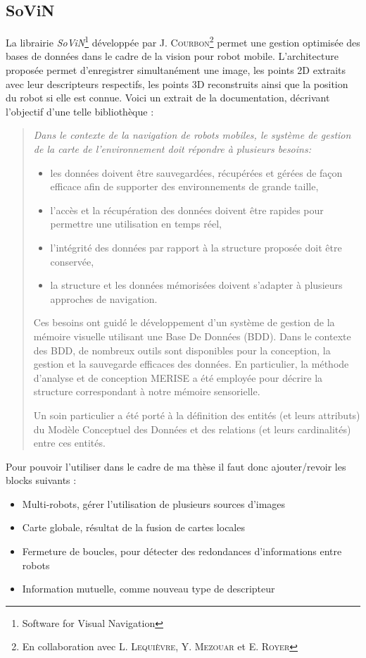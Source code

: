 \subsection{SoViN}
\label{subsub:sovin}

       
La librairie \emph{SoViN}\footnote{Software for Visual Navigation} développée par J. \textsc{Courbon}\footnote{En collaboration avec L. \textsc{Lequièvre}, Y. \textsc{Mezouar} et E. \textsc{Royer}} permet une gestion optimisée des bases de données dans le cadre de la vision pour robot mobile.
L'architecture proposée permet d'enregistrer simultanément une image, les points 2D extraits avec leur descripteurs respectifs, les points 3D reconstruits ainsi que la position du robot si elle est connue. Voici un extrait de la documentation, décrivant l'objectif d'une telle bibliothèque :
\begin{quote}
\it Dans le contexte de la navigation de robots mobiles, le système de gestion de la carte de l'environnement doit répondre à plusieurs besoins:
\begin{itemize}
\item les données doivent être sauvegardées, récupérées et gérées de façon efficace afin de supporter des environnements de grande taille,
\item l'accès et la récupération des données doivent être rapides pour permettre une utilisation en temps réel,
\item l'intégrité des données par rapport à la structure proposée doit être conservée,
\item la structure et les données mémorisées doivent s'adapter à plusieurs approches de navigation.
\end{itemize}

Ces besoins ont guidé le développement d'un système de gestion de la mémoire visuelle utilisant une Base De Données (BDD). Dans le contexte des BDD, de nombreux outils sont disponibles pour la conception, la gestion et la sauvegarde efficaces des données. En particulier, la méthode d'analyse et de conception MERISE a été employée pour décrire la structure correspondant à notre mémoire sensorielle.

Un soin particulier a été porté à la définition des entités (et leurs attributs) du Modèle Conceptuel des Données et des relations (et leurs cardinalités) entre ces entités.
\end{quote}

Pour pouvoir l'utiliser dans le cadre de ma thèse il faut donc ajouter/revoir les blocks suivants :
\begin{itemize}
\item Multi-robots, gérer l'utilisation de plusieurs sources d'images
\item Carte globale, résultat de la fusion de cartes locales
\item Fermeture de boucles, pour détecter des redondances d'informations entre robots
\item Information mutuelle, comme nouveau type de descripteur
\end{itemize}

